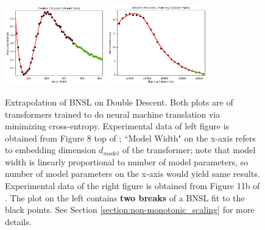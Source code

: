\documentclass{article} %
\begin{document}
\vspace{-3.5mm}


\FloatBarrier
\begin{figure}[h]%
    \centering


\includegraphics[width=0.385\textwidth]{figures/double_descent/double_descent__model_size.png}
\includegraphics[width=0.385\textwidth]{figures/double_descent/double_descent__dataset_size_1.png}
\vspace{-4.0mm}
    \caption{
    Extrapolation of BNSL on Double Descent. Both plots are of transformers trained to do neural machine translation via minimizing cross-entropy. Experimental data of left figure is obtained from Figure 8 top of \cite{nakkiran2021deep}; ``Model Width" on the x-axis refers to embedding dimension $d_{model}$ of the transformer; note that model width is linearly proportional to number of model parameters, so number of model parameters on the x-axis would yield same results. Experimental data of the right figure is obtained from Figure 11b of \cite{nakkiran2021deep}. The plot on the left contains \textbf{two breaks} of a BNSL fit to the black points. See Section \ref{section:non-monotonic_scaling} for more details.
    }
    \label{fig:double_descent}
\end{figure}

\vspace{-2.5mm}

\FloatBarrier
\end{document}
